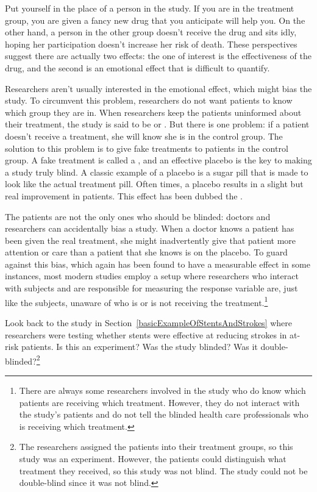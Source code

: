 Put yourself in the place of a person in the study. If you are in the treatment group, you are given a fancy new drug that you anticipate will help you. On the other hand, a person in the other group doesn't receive the drug and sits idly, hoping her participation doesn't increase her risk of death. These perspectives suggest there are actually two effects: the one of interest is the effectiveness of the drug, and the second is an emotional effect that is difficult to quantify.

Researchers aren't usually interested in the emotional effect, which might bias the study. To circumvent this problem, researchers do not want patients to know which group they are in. When researchers keep the patients uninformed about their treatment, the study is said to be  or . But there is one problem: if a patient doesn't receive a treatment, she will know she is in the control group. The solution to this problem is to give fake treatments to patients in the control group. A fake treatment is called a , and an effective placebo is the key to making a study truly blind. A classic example of a placebo is a sugar pill that is made to look like the actual treatment pill. Often times, a placebo results in a slight but real improvement in patients. This effect has been dubbed the .

The patients are not the only ones who should be blinded: doctors and researchers can accidentally bias a study. When a doctor knows a patient has been given the real treatment, she might inadvertently give that patient more attention or care than a patient that she knows is on the placebo. To guard against this bias, which again has been found to have a measurable effect in some instances, most modern studies employ a  setup where researchers who interact with subjects and are responsible for measuring the response variable are, just like the subjects, unaware of who is or is not receiving the treatment.\footnote{There are always some researchers involved in the study who do know which patients are receiving which treatment. However, they do not interact with the study's patients and do not tell the blinded health care professionals who is receiving which treatment.}


\begin{exercise}
Look back to the study in Section~\ref{basicExampleOfStentsAndStrokes} where researchers were testing whether stents were effective at reducing strokes in at-risk patients. Is this an experiment? Was the study blinded? Was it double-blinded?\footnote{The researchers assigned the patients into their treatment groups, so this study was an experiment. However, the patients could distinguish what treatment they received, so this study was not blind. The study could not be double-blind since it was not blind.}
\end{exercise}


